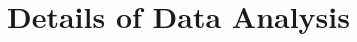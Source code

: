 \documentclass{article}
\begin{document}

\clearpage

\section{Details of Data Analysis} \label{data-analysis}
\end{document}
